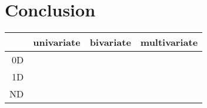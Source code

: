 \documentclass[letterpaper,onecolumn,titlepage]{Ythesis}
\begin{document}


\section{Conclusion}
\label{sec:conclusion}

\begin{tabular}{|r|r|r|r|}
  \hline
              & univariate & bivariate & multivariate\\
  \hline
   0D         &            &           &             \\
  \hline
   1D         &            &           &             \\
   \hline
   ND         &            &           &             \\
\end{tabular}

\pagebreak
\printbibliography
\end{document}
